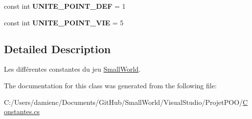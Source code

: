 \begin{DoxyCompactItemize}
\item 
\hypertarget{class_small_world_1_1_constantes_af35965bfcbd7b7772fd3e4284605cc11}{const int {\bfseries U\-N\-I\-T\-E\-\_\-\-P\-O\-I\-N\-T\-\_\-\-D\-E\-F} = 1}\label{class_small_world_1_1_constantes_af35965bfcbd7b7772fd3e4284605cc11}

\item 
\hypertarget{class_small_world_1_1_constantes_ab6c527d71bef08dfa0589b918c8394b5}{const int {\bfseries U\-N\-I\-T\-E\-\_\-\-P\-O\-I\-N\-T\-\_\-\-V\-I\-E} = 5}\label{class_small_world_1_1_constantes_ab6c527d71bef08dfa0589b918c8394b5}

\end{DoxyCompactItemize}


\subsection{Detailed Description}
Les différentes constantes du jeu \hyperlink{namespace_small_world}{Small\-World}. 

The documentation for this class was generated from the following file\-:\begin{DoxyCompactItemize}
\item 
C\-:/\-Users/damienc/\-Documents/\-Git\-Hub/\-Small\-World/\-Visual\-Studio/\-Projet\-P\-O\-O/\hyperlink{_constantes_8cs}{Constantes.\-cs}\end{DoxyCompactItemize}

